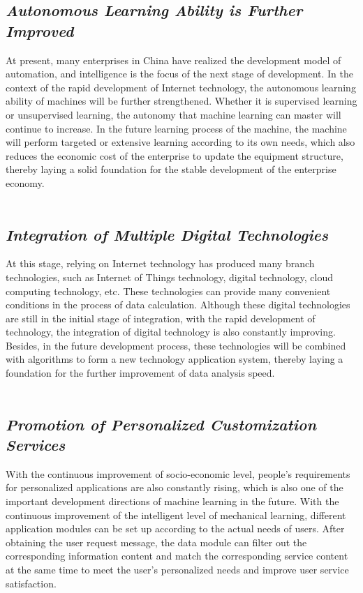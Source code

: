\documentclass{article}
\begin{document}
\subsection{\emph{Autonomous Learning Ability is Further Improved}}
At present, many enterprises in China have realized the development model of automation, and 
intelligence is the focus of the next stage of development. In the context of the rapid development of Internet technology, the autonomous learning ability of machines will be further strengthened. 
Whether it is supervised learning or unsupervised learning, the autonomy that machine learning can 
master will continue to increase. In the future learning process of the machine, the machine will 
perform targeted or extensive learning according to its own needs, which also reduces the economic 
cost of the enterprise to update the equipment structure, thereby laying a solid foundation for the stable 
development of the enterprise economy.
\\\\
\subsection{\emph{Integration of Multiple Digital Technologies}}
At this stage, relying on Internet technology has produced many branch technologies, such as Internet 
of Things technology, digital technology, cloud computing technology, etc. These technologies can 
provide many convenient conditions in the process of data calculation. Although these digital 
technologies are still in the initial stage of integration, with the rapid development of technology, the 
integration of digital technology is also constantly improving. Besides, in the future development 
process, these technologies will be combined with algorithms to form a new technology application 
system, thereby laying a foundation for the further improvement of data analysis speed.
\\\\
\subsection{\emph{Promotion of Personalized Customization Services}}
With the continuous improvement of socio-economic level, people's requirements for personalized 
applications are also constantly rising, which is also one of the important development directions of 
machine learning in the future. With the continuous improvement of the intelligent level of mechanical 
learning, different application modules can be set up according to the actual needs of users. After 
obtaining the user request message, the data module can filter out the corresponding information 
content and match the corresponding service content at the same time to meet the user's personalized 
needs and improve user service satisfaction.
\end{document}
